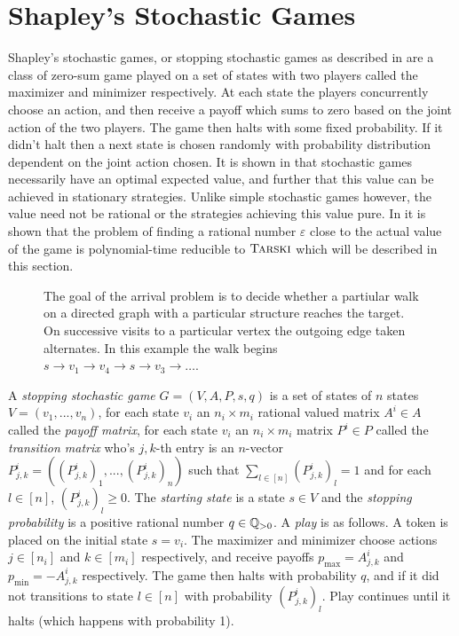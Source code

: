 \section{Shapley's Stochastic Games} \label{shapleyChap}
Shapley's stochastic games, or stopping stochastic games as described in \citep{shapley}
are a class of zero-sum game played on a set of states with two players
called the maximizer and minimizer respectively.
At each state the players concurrently choose an action,  
and then receive a payoff which sums to zero based on the joint
action of the two players. The game then halts with some fixed probability.
If it didn't halt then a next state is chosen randomly with probability distribution
dependent on the joint action chosen.
It is shown in \citep{shapley} that stochastic games necessarily have an optimal expected value,
and further that this value can be achieved in stationary strategies. Unlike
simple stochastic games however, the value need not be rational or the strategies
achieving this value pure. In \citep{lowerBound} it is shown that the  problem
of finding a rational number $\varepsilon$ close to the actual value of the game
is polynomial-time reducible to $\textsc{Tarski}$ which will be described in this section.
\begin{figure}[h]
  \centering
  
  \caption{The goal of the arrival problem is to decide whether a partiular walk on a directed graph with a particular
  structure reaches the target. On successive visits to a particular
  vertex the outgoing edge taken alternates. In this example
  the walk begins $s \to v_1 \to v_4 \to s \to v_3 \to \ldots$.} 
\end{figure}
\begin{definition}
  A \emph{stopping stochastic game} $G = (V, A, P, s, q)$ is a set of states of $n$ states
  $V = (v_1, ..., v_n)$, for each state $v_i$ an $n_i \times m_i$ rational valued matrix $A^i \in A$ called
  the \emph{payoff matrix}, for each state $v_i$ an $n_i \times m_i$ matrix $P^i \in P$ called
  the \emph{transition matrix} who's $j, k$-th entry is an $n$-vector 
  $P_{j, k}^i = \left((P_{j, k}^i)_1, ..., (P_{j, k}^i)_n \right)$
  such that $\sum_{l \in [n]} (P_{j, k}^i)_l = 1$ and for each $l \in [n]$, $(P_{j, k}^i)_l \geq 0$.
  The \emph{starting state} is a state $s \in V$ and the \emph{stopping probability} is a positive
  rational number $q \in \mathbb{Q}_{> 0}$. A \emph{play} is as follows. A token is placed on the initial
  state $s = v_i$. The maximizer and minimizer choose actions $j \in [n_i]$ and $k \in [m_i]$ respectively,
  and receive payoffs $p_{\max} = A_{j, k}^i$ and $p_{\min} = -A_{j, k}^i$ respectively. The game then
  halts with probability $q$, and if it did not transitions to state $l \in [n]$ with probability
  $(P_{j, k}^i)_l$. Play continues until it halts (which happens with probability 1).
\end{definition}
